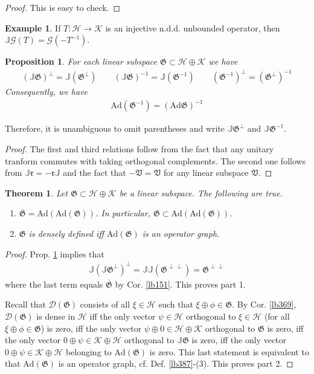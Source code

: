 \documentclass[12pt,b5paper,notitlepage]{article}
\theoremstyle{definition}
\newtheorem{eg}[df]{Example}
\theoremstyle{plain}
\newtheorem{thm}[df]{Theorem}
\newtheorem{pp}[df]{Proposition}
\newcommand{\fk}{\mathfrak}
\newcommand{\ovl}{\overline}
\newcommand{\Dom}{\mathscr{D}}
\newcommand{\Ad}{\mathrm{Ad}}
\newcommand{\Jbb}{\mathbb J}
\newcommand{\MH}{\mathcal H}
\newcommand{\MK}{\mathcal K}
\newcommand{\SG}{\mathscr G}
\numberwithin{equation}{section}
\begin{document}
\begin{proof}
This is easy to check.
\end{proof}

\begin{eg}
If $T:\MH\rightarrow\MK$ is an injective n.d.d. unbounded operator, then $\Jbb\SG(T)=\SG(-T^{-1})$.
\end{eg}


\begin{pp}\label{lb399}
For each linear subspace $\fk G\subset\MH\oplus\MK$ we have
\begin{align*}
(\Jbb\fk G)^\perp=\Jbb(\fk G^\perp)\qquad (\Jbb\fk G)^{-1}=\Jbb(\fk G^{-1})\qquad (\fk G^{-1})^\perp=(\fk G^\perp)^{-1}
\end{align*}
Consequently, we have
\begin{align*}
\Ad(\fk G^{-1})=(\Ad\fk G)^{-1}
\end{align*}
\end{pp}

Therefore, it is unambiguous to omit parentheses and write $\Jbb\fk G^\perp$ and $\Jbb\fk G^{-1}$.

\begin{proof}
The first and third relations follow from the fact that any unitary tranform commutes with taking orthogonal complements.  The second one follows from $\Jbb\fk r=-\fk r\Jbb$ and the fact that $-\fk V=\fk V$ for any linear subspace $\fk V$.
\end{proof}








\begin{thm}\label{lb400}
Let $\fk G\subset\MH\oplus\MK$ be a linear subspace. The following are true.
\begin{enumerate}
\item $\ovl{\fk G}=\Ad(\Ad(\fk G))$. In particular, $\fk G\subset\Ad(\Ad(\fk G))$.
\item $\fk G$ is densely defined iff $\Ad(\fk G)$ is an operator graph.
\end{enumerate}
\end{thm}

\begin{proof}
Prop. \ref{lb399} implies that
\begin{align*}
\Jbb(\Jbb\fk G^\perp)^\perp=\Jbb\Jbb(\fk G^{\perp\perp})=\fk G^{\perp\perp}
\end{align*}
where the last term equals $\ovl{\fk G}$ by Cor. \ref{lb151}. This proves part 1.



Recall that $\Dom(\fk G)$ consists of all $\xi\in\MH$ such that $\xi\oplus\phi\in\fk G$. By Cor. \ref{lb369}, $\Dom(\fk G)$ is dense in $\MH$ iff the only vector $\psi\in\MH$ orthogonal to $\xi\in\MH$ (for all $\xi\oplus\phi\in\fk G$) is zero, iff the only vector $\psi\oplus 0\in\MH\oplus \MK$ orthogonal to $\fk G$ is zero, iff the only vector $0\oplus\psi\in\MK\oplus\MH$ orthogonal to $\Jbb\fk G$ is zero, iff the only vector $0\oplus\psi\in\MK\oplus\MH$ belonging to $\Ad(\fk G)$ is zero. This last statement is equivalent to that $\Ad(\fk G)$ is an operator graph, cf. Def. \ref{lb387}-(3). This proves part 2.
\end{proof}
\end{document}
